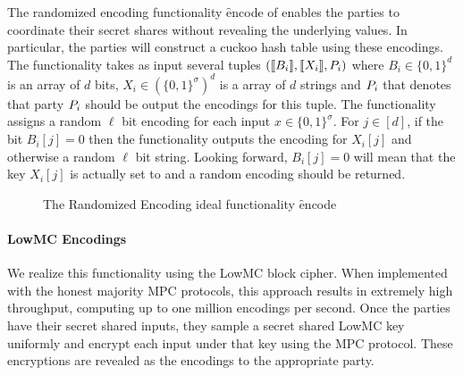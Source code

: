 The randomized encoding functionality \f{encode} of  enables the parties to coordinate their secret shares without revealing the underlying values. In particular, the parties will construct a cuckoo hash table using these encodings. The functionality takes as input several tuples $(\llbracket B_i\rrbracket,\llbracket X_i\rrbracket,P_{i})$ where $B_i\in\{0,1\}^d$ is an array of $d$ bits, $ X_i\in(\{0,1\}^\sigma)^{d}$ is a array of $d$ strings and  $P_{i}$ that denotes that party $P_{i}$ should be output the encodings for this tuple. The functionality assigns a random $\ell$ bit encoding for each input $x\in \{0,1\}^\sigma$. For $j\in[d]$, if the bit $B_i[j]=0$ then the functionality outputs the encoding for $X_i[j]$ and otherwise a random $\ell$ bit string. Looking forward, $B_i[j]=0$ will mean that the key $X_i[j]$ is actually set to \Null and a random encoding should be returned.



\begin{figure}[ht]
	\caption{The Randomized Encoding ideal functionality \f{encode}}
	\label{fig:randomized-encode-ideal}	
\end{figure}


\paragraph{LowMC Encodings}
We realize this functionality using the LowMC block cipher\cite{lowmc}. When implemented with the honest majority MPC protocols\cite{highthroughput}, this approach results in extremely high throughput, computing up to one million encodings per second. Once the parties have their secret shared inputs, they sample a secret shared LowMC key uniformly and encrypt each input under that key using the MPC protocol. These encryptions are revealed as the encodings to the appropriate party.


